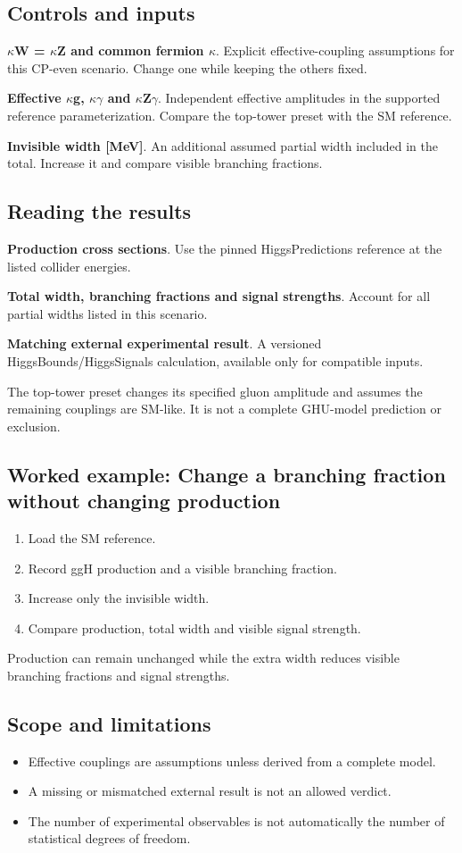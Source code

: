 \documentclass[11pt,a4paper]{article}
\begin{document}
\subsection*{Controls and inputs}
\textbf{\ensuremath{\kappa}W = \ensuremath{\kappa}Z and common fermion \ensuremath{\kappa}}. Explicit effective-coupling assumptions for this CP-even scenario. Change one while keeping the others fixed.

\textbf{Effective \ensuremath{\kappa}g, \ensuremath{\kappa}\ensuremath{\gamma} and \ensuremath{\kappa}Z\ensuremath{\gamma}}. Independent effective amplitudes in the supported reference parameterization. Compare the top-tower preset with the SM reference.

\textbf{Invisible width [MeV]}. An additional assumed partial width included in the total. Increase it and compare visible branching fractions.

\subsection*{Reading the results}
\textbf{Production cross sections}. Use the pinned HiggsPredictions reference at the listed collider energies.

\textbf{Total width, branching fractions and signal strengths}. Account for all partial widths listed in this scenario.

\textbf{Matching external experimental result}. A versioned HiggsBounds/HiggsSignals calculation, available only for compatible inputs.

The top-tower preset changes its specified gluon amplitude and assumes the remaining couplings are SM-like. It is not a complete GHU-model prediction or exclusion.
\subsection*{Worked example: Change a branching fraction without changing production}
\begin{enumerate}
\item Load the SM reference.
\item Record ggH production and a visible branching fraction.
\item Increase only the invisible width.
\item Compare production, total width and visible signal strength.
\end{enumerate}
Production can remain unchanged while the extra width reduces visible branching fractions and signal strengths.
\subsection*{Scope and limitations}
\begin{itemize}
\item Effective couplings are assumptions unless derived from a complete model.
\item A missing or mismatched external result is not an allowed verdict.
\item The number of experimental observables is not automatically the number of statistical degrees of freedom.
\end{itemize}
\end{document}
